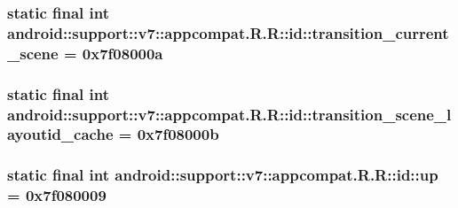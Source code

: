 \hypertarget{classandroid_1_1support_1_1v7_1_1appcompat_1_1_r_1_1id_a9a0f4fe26c928c008dfd5a0975f5243}{
\subsubsection[{transition\_\-current\_\-scene}]{\setlength{\rightskip}{0pt plus 5cm}static final int android::support::v7::appcompat.R.R::id::transition\_\-current\_\-scene = 0x7f08000a}}
\label{classandroid_1_1support_1_1v7_1_1appcompat_1_1_r_1_1id_a9a0f4fe26c928c008dfd5a0975f5243}


\hypertarget{classandroid_1_1support_1_1v7_1_1appcompat_1_1_r_1_1id_d3655cba6bb09a652a5c7d7239d29c12}{
\subsubsection[{transition\_\-scene\_\-layoutid\_\-cache}]{\setlength{\rightskip}{0pt plus 5cm}static final int android::support::v7::appcompat.R.R::id::transition\_\-scene\_\-layoutid\_\-cache = 0x7f08000b}}
\label{classandroid_1_1support_1_1v7_1_1appcompat_1_1_r_1_1id_d3655cba6bb09a652a5c7d7239d29c12}


\hypertarget{classandroid_1_1support_1_1v7_1_1appcompat_1_1_r_1_1id_b2185511144c362f1446c9892507c6ff}{
\subsubsection[{up}]{\setlength{\rightskip}{0pt plus 5cm}static final int android::support::v7::appcompat.R.R::id::up = 0x7f080009}}
\label{classandroid_1_1support_1_1v7_1_1appcompat_1_1_r_1_1id_b2185511144c362f1446c9892507c6ff}


